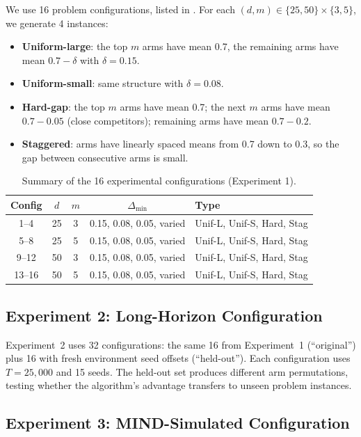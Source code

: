 \documentclass{article}
\theoremstyle{plain}
\theoremstyle{definition}
\theoremstyle{remark}
\newcommand{\gap}{\Delta_{\min}}
\begin{document}
We use 16 problem configurations, listed in .
For each $(d, m) \in \{25, 50\} \times \{3, 5\}$, we generate 4 instances:
\begin{itemize}
\item \textbf{Uniform-large}: the top $m$ arms have mean 0.7, the remaining arms have mean $0.7 - \delta$ with $\delta = 0.15$.
\item \textbf{Uniform-small}: same structure with $\delta = 0.08$.
\item \textbf{Hard-gap}: the top $m$ arms have mean 0.7; the next $m$ arms have mean $0.7 - 0.05$ (close competitors); remaining arms have mean $0.7 - 0.2$.
\item \textbf{Staggered}: arms have linearly spaced means from 0.7 down to 0.3, so the gap between consecutive arms is small.
\end{itemize}

\begin{table}[h]
\caption{Summary of the 16 experimental configurations (Experiment 1).}
\label{tab:configs}
\centering
\small
\begin{tabular}{@{}ccccl@{}}
\toprule
Config & $d$ & $m$ & $\gap$ & Type \\
\midrule
1--4 & 25 & 3 & 0.15, 0.08, 0.05, varied & Unif-L, Unif-S, Hard, Stag \\
5--8 & 25 & 5 & 0.15, 0.08, 0.05, varied & Unif-L, Unif-S, Hard, Stag \\
9--12 & 50 & 3 & 0.15, 0.08, 0.05, varied & Unif-L, Unif-S, Hard, Stag \\
13--16 & 50 & 5 & 0.15, 0.08, 0.05, varied & Unif-L, Unif-S, Hard, Stag \\
\bottomrule
\end{tabular}
\end{table}

\subsection{Experiment 2: Long-Horizon Configuration}

Experiment~2 uses 32 configurations: the same 16 from Experiment~1 (``original'') plus 16 with fresh environment seed offsets (``held-out'').
Each configuration uses $T = 25{,}000$ and 15 seeds.
The held-out set produces different arm permutations, testing whether the algorithm's advantage transfers to unseen problem instances.

\subsection{Experiment 3: MIND-Simulated Configuration}
\end{document}
